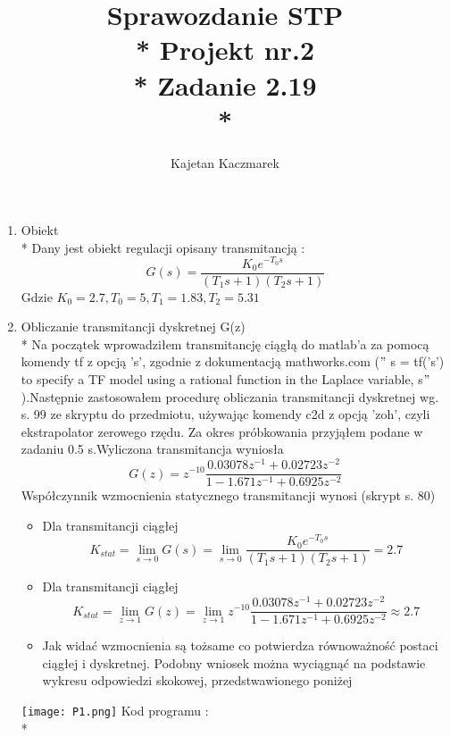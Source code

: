 \documentclass[a4paper, 11pt]{article}
\author{Kajetan Kaczmarek}
\begin{document}
\title{Sprawozdanie STP \\* Projekt nr.2 \\* 
Zadanie 2.19 \\*}
\maketitle
\begin{enumerate}
\item Obiekt\\*
Dany jest obiekt regulacji opisany transmitancją : \[ G(s) = \dfrac{K_0e^{-T_0s}}{(T_1s + 1)(T_2s + 1)}\] %
Gdzie \( K_0 = 2.7 , T_0=5,T_1 = 1.83 , T_2=5.31 \)
\item Obliczanie transmitancji dyskretnej G(z) \\*
Na początek wprowadziłem transmitancję ciągłą do matlab'a za pomocą komendy tf z opcją 's', zgodnie z dokumentacją mathworks.com (\("\) s = tf('s') to specify a TF model using a rational function in the Laplace variable, s\("\)).Następnie zastosowałem procedurę obliczania transmitancji dyskretnej wg. s. 99 ze skryptu do przedmiotu, używając komendy c2d z opcją 'zoh', czyli ekstrapolator zerowego rzędu. Za okres próbkowania przyjąłem podane w zadaniu 0.5 s.Wyliczona transmitancja wyniosła \[ G(z) =z^{-10}\dfrac{0.03078 z^{-1} + 0.02723z^{-2}}{ 1 - 1.671 z^{-1} + 0.6925z^{-2}} \]
Współczynnik wzmocnienia statycznego transmitancji wynosi (skrypt s. 80)
\begin{itemize}
\item Dla transmitancji ciągłej \[K_{stat} = \lim_{s\to 0} G(s) = \lim_{s\to 0}  \dfrac{K_0e^{-T_0s}}{(T_1s + 1)(T_2s + 1)} = 2.7\]

\item Dla transmitancji ciągłej \[K_{stat} = \lim_{z\to 1} G(z) = \lim_{z\to 1}  z^{-10}\dfrac{0.03078 z^{-1} + 0.02723z^{-2}}{ 1 - 1.671 z^{-1} + 0.6925z^{-2}}  \approx 2.7\]
\item Jak widać wzmocnienia są tożsame co potwierdza równoważność postaci ciągłej i dyskretnej. Podobny wniosek można wyciągnąć na podstawie wykresu odpowiedzi skokowej, przedstwawionego poniżej
\end{itemize}
\texttt{[image: P1.png]}
Kod programu : \\*



\end{enumerate}
\end{document}

